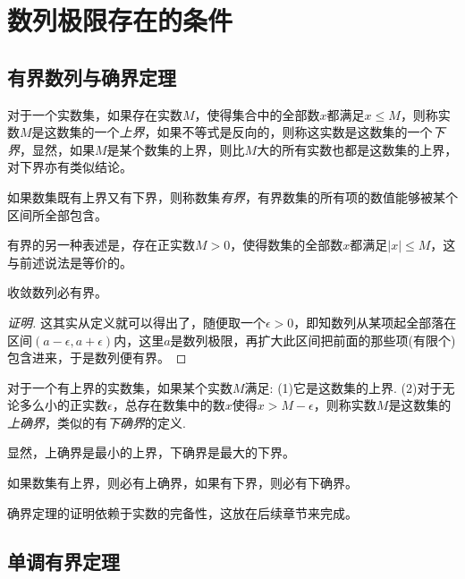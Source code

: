 
\section{数列极限存在的条件}
\label{sec:condition-of-limit-exists}

\subsection{有界数列与确界定理}
\label{sec:bound-number-sequence}

对于一个实数集，如果存在实数$M$，使得集合中的全部数$x$都满足$x \leqslant M$，则称实数$M$是这数集的一个\emph{上界}，如果不等式是反向的，则称这实数是这数集的一个\emph{下界}，显然，如果$M$是某个数集的上界，则比$M$大的所有实数也都是这数集的上界，对下界亦有类似结论。

如果数集既有上界又有下界，则称数集\emph{有界}，有界数集的所有项的数值能够被某个区间所全部包含。

有界的另一种表述是，存在正实数$M>0$，使得数集的全部数$x$都满足$|x| \leqslant M$，这与前述说法是等价的。

\begin{theorem}[收敛数列的有界性]
  收敛数列必有界。
\end{theorem}

\begin{proof}[证明]
  这其实从定义就可以得出了，随便取一个$\epsilon>0$，即知数列从某项起全部落在区间$(a-\epsilon, a+\epsilon)$内，这里$a$是数列极限，再扩大此区间把前面的那些项(有限个)包含进来，于是数列便有界。
\end{proof}

\begin{definition}
对于一个有上界的实数集，如果某个实数$M$满足: (1)它是这数集的上界. (2)对于无论多么小的正实数$\epsilon$，总存在数集中的数$x$使得$x>M-\epsilon$，则称实数$M$是这数集的\emph{上确界}，类似的有\emph{下确界}的定义.
\end{definition}

显然，上确界是最小的上界，下确界是最大的下界。

\begin{theorem}[确界定理]
  如果数集有上界，则必有上确界，如果有下界，则必有下确界。
\end{theorem}

确界定理的证明依赖于实数的完备性，这放在后续章节来完成。

\subsection{单调有界定理}
\label{sec:monotone-bound-theorem}

